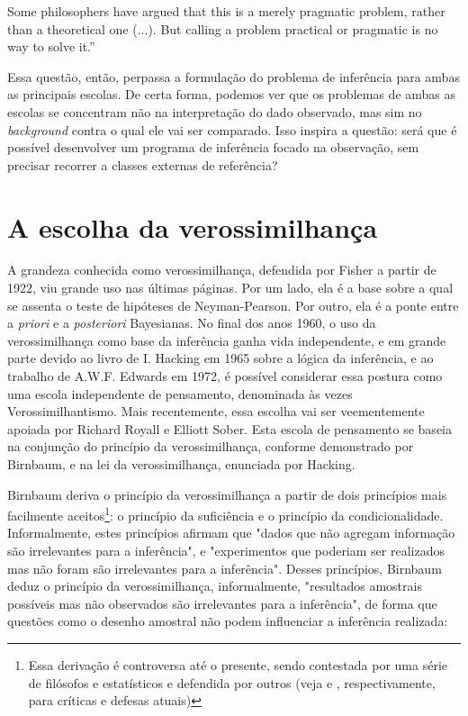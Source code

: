 Some philosophers have argued that this is a merely pragmatic problem, rather than a theoretical one (...). But calling
a problem practical or pragmatic is no way to solve it.'' \citep{Kyburg74}

Essa questão, então, perpassa a formulação do problema de inferência para ambas as principais escolas. De certa forma,
podemos ver que os problemas de ambas as escolas se concentram não na interpretação do dado observado, mas sim
no {\em background} contra o qual ele vai ser comparado. Isso inspira a questão: será que é possível desenvolver
um programa de inferência focado na observação, sem precisar recorrer a classes externas de referência?

\section{A escolha da verossimilhança}\label{sec:likelihood}

A grandeza conhecida como verossimilhança, defendida por Fisher a partir de 1922, viu grande uso nas últimas páginas. Por um lado,
ela é a base sobre a qual se assenta o teste de hipóteses de Neyman-Pearson. Por outro, ela é a ponte entre a {\em priori}
e a {\em posteriori} Bayesianas. No final dos anos 1960, o uso da verossimilhança como base da inferência ganha vida 
independente, e em grande parte devido ao livro de I. Hacking em 1965 sobre a lógica da inferência, 
e ao trabalho de A.W.F. Edwards em 1972, é possível considerar essa postura como
uma escola independente de pensamento, denominada às vezes Verossimilhantismo. Mais recentemente, essa escolha vai ser
veementemente apoiada por Richard Royall e Elliott Sober. Esta escola de pensamento se baseia na conjunção do princípio da 
verossimilhança, conforme demonstrado por Birnbaum, e na lei da verossimilhança, enunciada por Hacking.

Birnbaum deriva o princípio da verossimilhança a partir de dois princípios mais facilmente aceitos\footnote{
Essa derivação é controversa até o presente, sendo contestada por uma série de filósofos e estatísticos 
e defendida por outros (veja \citep{Mayo10} e \citep{Gandenberger12}, respectivamente, para críticas e defesas
atuais)}: o princípio da suficiência e o princípio da condicionalidade. Informalmente, estes princípios afirmam que
"dados que não agregam informação são irrelevantes para a inferência", e "experimentos que poderiam ser realizados
mas não foram são irrelevantes para a inferência". Desses princípios, Birnbaum deduz o princípio da verossimilhança,
informalmente, "resultados amostrais possíveis mas não observados são irrelevantes para a inferência", de forma 
que questões como o desenho amostral não podem influenciar a inferência realizada: 

